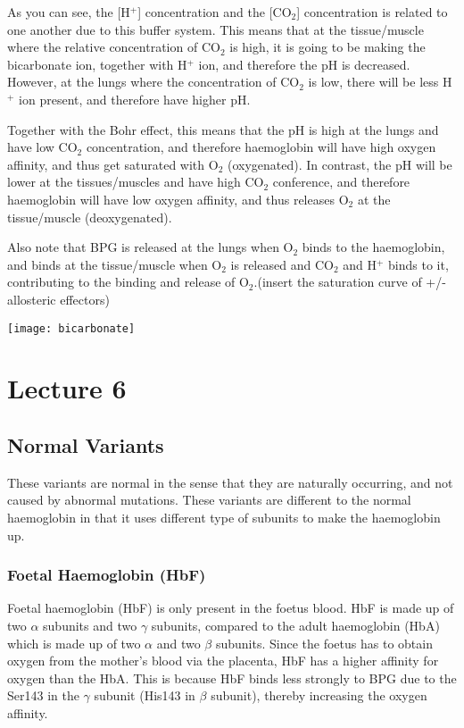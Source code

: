 \documentclass[a4paper, 12pt]{report}
\newcommand{\mychapter}[2]{
    \setcounter{chapter}{#1}
    \setcounter{section}{0}
    \chapter*{#2}
    \addcontentsline{toc}{chapter}{#2}
}
\begin{document}
\begin{center}
\end{center}

As you can see, the [H$^+$] concentration and the [CO$_2$] concentration is related to one another due to this buffer system.
This means that at the tissue/muscle where the relative concentration of CO$_2$ is high, it is going to be making the bicarbonate ion, together with H$^+$ ion, and therefore the pH is decreased.
However, at the lungs where the concentration of CO$_2$ is low, there will be less H$^+$ ion present, and therefore have higher pH.

Together with the Bohr effect, this means that the pH is high at the lungs and have low CO$_2$ concentration, and therefore haemoglobin will have high oxygen affinity, and thus get saturated with O$_2$ (oxygenated).
In contrast, the pH will be lower at the tissues/muscles and have high CO$_2$ conference, and therefore haemoglobin will have low oxygen affinity, and thus releases O$_2$ at the tissue/muscle (deoxygenated).

Also note that BPG is released at the lungs when O$_2$ binds to the haemoglobin, and binds at the tissue/muscle when O$_2$ is released and CO$_2$ and H$^+$ binds to it, contributing to the binding and release of O$_2$.(insert the saturation curve of +/- allosteric effectors)

\texttt{[image: bicarbonate]}

\mychapter{6}{Lecture 6}

\section{Normal Variants}

These variants are normal in the sense that they are naturally occurring, and not caused by abnormal mutations.
These variants are different to the normal haemoglobin in that it uses different type of subunits to make the haemoglobin up.

\subsection{Foetal Haemoglobin (HbF)}

Foetal haemoglobin (HbF) is only present in the foetus blood.
HbF is made up of two $\alpha$ subunits and two $\gamma$ subunits, compared to the adult haemoglobin (HbA) which is made up of two $\alpha$ and two $\beta$ subunits.
Since the foetus has to obtain oxygen from the mother's blood via the placenta, HbF has a higher affinity for oxygen than the HbA.
This is because HbF binds less strongly to BPG due to the Ser143 in the $\gamma$ subunit (His143 in $\beta$ subunit), thereby increasing the oxygen affinity.
\end{document}
